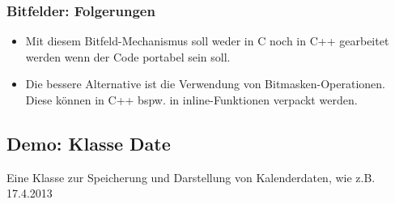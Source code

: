 
\subsubsection{Bitfelder: Folgerungen}
\label{sec:Bitfelder: Folgerungen}
\begin{itemize}
	\item Mit diesem Bitfeld-Mechanismus soll weder in C noch in C++ gearbeitet werden wenn der Code portabel sein soll.
	\item Die bessere Alternative ist die Verwendung von Bitmasken-Operationen. Diese können in C++ bspw. in inline-Funktionen verpackt werden.
\end{itemize}

\subsection{Demo: Klasse Date}
Eine Klasse zur Speicherung und Darstellung von Kalenderdaten, wie z.B. 17.4.2013






